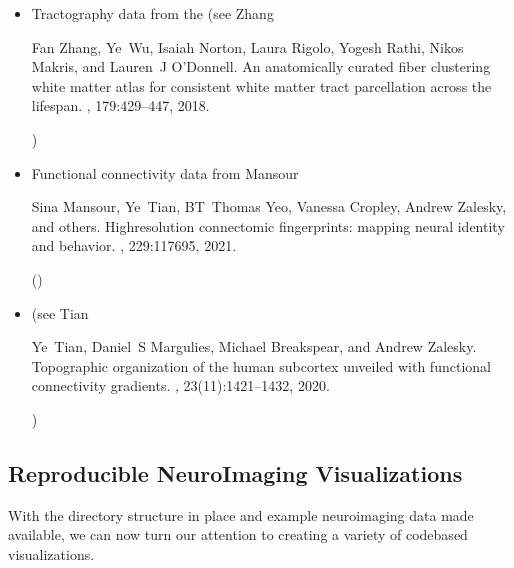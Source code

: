 \documentclass[letterpaper,10pt,english]{jupyterBook}
\begin{document}
\begin{itemize}
\item {} 
\sphinxAtStartPar
Tractography data from the  (see Zhang %
\begin{footnote}[5]\sphinxAtStartFootnote
Fan Zhang, Ye Wu, Isaiah Norton, Laura Rigolo, Yogesh Rathi, Nikos Makris, and Lauren J O’Donnell. An anatomically curated fiber clustering white matter atlas for consistent white matter tract parcellation across the lifespan. , 179:429–447, 2018.
%
\end{footnote})

\item {} 
\sphinxAtStartPar
Functional connectivity data from Mansour %
\begin{footnote}[6]\sphinxAtStartFootnote
Sina Mansour, Ye Tian, BT Thomas Yeo, Vanessa Cropley, Andrew Zalesky, and others. High\sphinxhyphen{}resolution connectomic fingerprints: mapping neural identity and behavior. , 229:117695, 2021.
%
\end{footnote} ()

\item {} 
\sphinxAtStartPar
{} (see Tian %
\begin{footnote}[7]\sphinxAtStartFootnote
Ye Tian, Daniel S Margulies, Michael Breakspear, and Andrew Zalesky. Topographic organization of the human subcortex unveiled with functional connectivity gradients. , 23(11):1421–1432, 2020.
%
\end{footnote})

\end{itemize}




\subsection{Reproducible NeuroImaging Visualizations}
\label{\detokenize{chapters/03/03c_visualization-examples:reproducible-neuroimaging-visualizations}}
\sphinxAtStartPar
With the directory structure in place and example neuroimaging data made available, we can now turn our attention to creating a variety of code\sphinxhyphen{}based visualizations.
\end{document}
